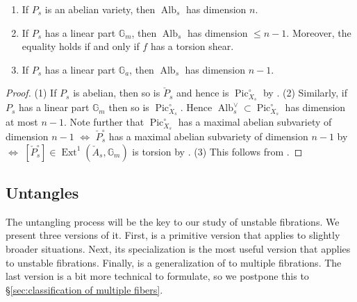\documentclass[reqno, letterpaper]{amsart}
\numberwithin{equation}{subsection}
\newcommand{\GG}{\mathbb{G}}
\DeclareMathOperator{\Ext}{Ext}
\DeclareMathOperator{\Pic}{Pic}
\DeclareMathOperator{\Alb}{Alb}
\begin{document}
		\begin{corollary} \label{cor:dimension of Albanese}
			\begin{enumerate}
				\item If $P_s$ is an abelian variety, then $\Alb_s$ has dimension $n$.
				\item If $P_s$ has a linear part $\GG_m$, then $\Alb_s$ has dimension $\le n-1$. Moreover, the equality holds if and only if $f$ has a torsion shear.
				\item If $P_s$ has a linear part $\GG_a$, then $\Alb_s$ has dimension $n-1$.
			\end{enumerate}
		\end{corollary}
		\begin{proof}
			(1) If $P_s$ is abelian, then so is $\check P_s$ and hence is $\Pic^\circ_{X_s}$ by . (2) Similarly, if $P_s$ has a linear part $\GG_m$ then so is $\Pic^\circ_{X_s}$. Hence $\Alb_s^{\vee} \subset \Pic^\circ_{X_s}$ has dimension at most $n-1$. Note further that $\Pic^\circ_{X_s}$ has a maximal abelian subvariety of dimension $n-1$ $\Longleftrightarrow$ $\check P^\circ_s$ has a maximal abelian subvariety of dimension $n-1$ by  $\Longleftrightarrow$ $[\check P^\circ_s] \in \Ext^1 (\check A_s, \GG_m)$ is torsion by \cite[Lemma~1(b)]{mat-miy66}. (3) This follows from .
		\end{proof}
		
		
		
	\subsection{Untangles} \label{sec:untangling process}
		The untangling process will be the key to our study of unstable fibrations. We present three versions of it. First,  is a primitive version that applies to slightly broader situations. Next, its specialization  is the most useful version that applies to unstable fibrations. Finally,  is a generalization of  to multiple fibrations. The last version is a bit more technical to formulate, so we postpone this to \S \ref{sec:classification of multiple fibers}.
		
\end{document}
